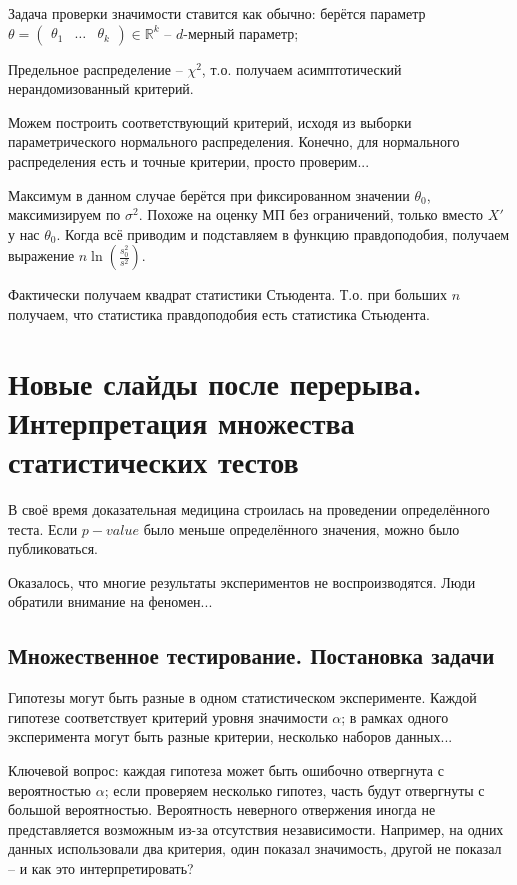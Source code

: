 \documentclass[main.tex]{subfiles}
\begin{document}
Задача проверки значимости ставится как обычно: берётся параметр $ \theta = \begin{pmatrix}
	\theta_1 & \dots & \theta_k
\end{pmatrix} \in \mathds R^k $ -- $ d $-мерный параметр;


Предельное распределение -- $ \chi^2 $, т.о. получаем асимптотический нерандомизованный критерий.

Можем построить соответствующий критерий, исходя из выборки параметрического нормального распределения.
Конечно, для нормального распределения есть и точные критерии, просто проверим...


Максимум в данном случае берётся при фиксированном значении $ \theta_0 $, максимизируем по $\sigma^2$.
Похоже на оценку МП без ограничений, только вместо $X'$ у нас $ \theta_0 $.
Когда всё приводим и подставляем в функцию правдоподобия, получаем выражение $ n \ln \left(\frac{s_0^2}{s^2}\right) $.

Фактически получаем квадрат статистики Стьюдента.
Т.о. при больших $ n $ получаем, что статистика правдоподобия есть статистика Стьюдента.

\section{Новые слайды после перерыва. Интерпретация множества статистических тестов}

В своё время доказательная медицина строилась на проведении определённого теста.
Если $p-value$ было меньше определённого значения, можно было публиковаться.

Оказалось, что многие результаты экспериментов не воспроизводятся.
Люди обратили внимание на феномен...

\subsection{Множественное тестирование. Постановка задачи}

Гипотезы могут быть разные в одном статистическом эксперименте.
Каждой гипотезе соответствует критерий уровня значимости $\alpha$; в рамках одного эксперимента могут быть разные критерии, несколько наборов данных...

Ключевой вопрос: каждая гипотеза может быть ошибочно отвергнута с вероятностью $ \alpha $; если проверяем несколько гипотез, часть будут отвергнуты с большой вероятностью. Вероятность неверного отвержения иногда не представляется возможным из-за отсутствия независимости. Например, на одних данных использовали два критерия, один показал значимость, другой не показал -- и как это интерпретировать?
\end{document}
